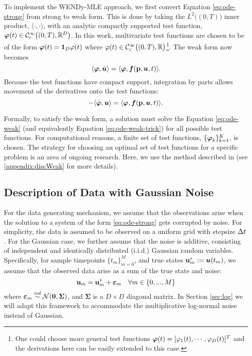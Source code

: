 To implement the WENDy-MLE approach, we first convert Equation \eqref{eq:ode-strong} from strong to weak form. This is done by taking the $L^2\bigl((0,T)\bigr)$ inner product, $\langle \cdot, \cdot\rangle$, with an analytic compactly supported test function, $\boldsymbol{\varphi}(t)\in \mathcal{C}^\infty_c\bigl((0,T), \mathbb{R}^D\bigr)$. In this work, multivariate test functions are chosen to be of the form $\boldsymbol{\varphi}(t) = \mathbf{1}_D \varphi(t)$ where $\varphi(t) \in \mathcal{C}^\infty_c\bigl((0,T), \mathbb{R}\bigr)$\footnote{One could choose more general test functions $\boldsymbol{\varphi}(t) = [\varphi_1(t), \cdots, \varphi_D(t)]^T$ and the derivations here can be easily extended to this case.}. The weak form now becomes
\begin{equation}
	\label{eq:ode-weak}
	\langle \boldsymbol{\varphi}, \dot{\boldsymbol{u}}\rangle = \langle \boldsymbol{\varphi},\boldsymbol{f}(\mathbf{p}, \boldsymbol{u}, t)\rangle.
\end{equation}
Because the test functions have compact support, integration by parts allows movement of the derivatives onto the test functions: 
\begin{equation}
	\label{eq:ode-weak-trick}
	-\langle \dot{\boldsymbol{\varphi}}, \boldsymbol{u}\rangle = \langle \boldsymbol{\varphi}, \boldsymbol{f}(\mathbf{p}, \boldsymbol{u}, t)\rangle.
\end{equation}

Formally, to satisfy the weak form, a solution must solve the Equation \eqref{eq:ode-weak} (and equivalently Equation \eqref{eq:ode-weak-trick}) for all possible test functions. For computational reasons, a finite set of test functions, $\{\boldsymbol{\varphi}_k\}_{k=1}^K$, is chosen. The strategy for choosing an optimal set of test functions for a specific problem is an area of ongoing research. Here, we use the method described in \citep{BortzMessengerDukic2023BullMathBiol} (see \ref{appendix:discWeak} for more details). 

\subsection{Description of Data with Gaussian Noise} \label{sec:dataDesc}
For the data generating mechanism, we assume that the  observations arise when the solution to a system of the form \eqref{eq:ode-strong} gets corrupted by noise. For simplicity, the data is assumed to be observed on a uniform grid with stepsize $\Delta t$. For the Gaussian case, we further assume that the noise is additive, consisting of independent and identically distributed (i.i.d.) Gaussian random variables. Specifically, for sample timepoints $\{t_m\}_{m=0}^M$, and true states $\mathbf{u}^*_m:=\boldsymbol{u}(t_m)$, we assume that the observed data arise as  a sum of the true state and noise: 
$$\mathbf{u}_m = \mathbf{u}^*_m+\boldsymbol{\varepsilon}_m\quad \forall m \in \{0, ..., M\}$$ 
where $\boldsymbol{\varepsilon}_m \stackrel{iid}{\sim}\mathcal{N}({\mathbf 0},{\mathbf{\Sigma}})$, and ${\mathbf{\Sigma}}$ is a $D \times D$ diagonal matrix. In Section \ref{sec:log} we will adapt this framework to accommodate the multiplicative log-normal noise instead of Gaussian. 

